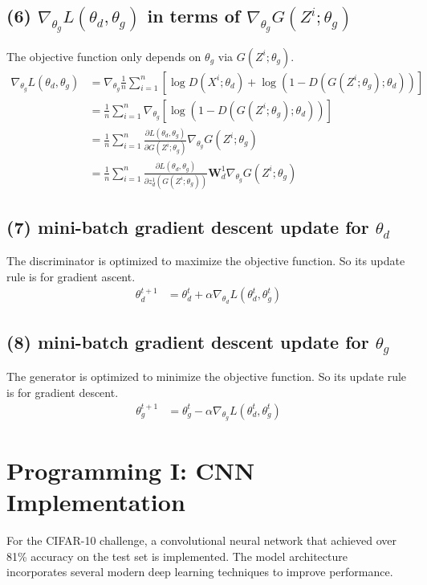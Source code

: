 \documentclass[11pt, a4paper, oneside]{memoir}
\begin{document}
\section*{(6) $\nabla_{\theta_g} L(\theta_d, \theta_g)$ in terms of $\nabla_{\theta_g} G(Z^i; \theta_g)$}
The objective function only depends on $\theta_g$ via $G(Z^i; \theta_g)$.
\begin{align*}
\nabla_{\theta_g} L (\theta_d, \theta_g) &= \nabla_{\theta_g} \frac{1}{n}\sum_{i=1}^{n} \left[ \log D(X^i; \theta_d) + \log (1 - D(G(Z^i; \theta_g); \theta_d)) \right] \\
&= \frac{1}{n}\sum_{i=1}^{n} \nabla_{\theta_g} \left[ \log (1 - D(G(Z^i; \theta_g); \theta_d)) \right] \\
&= \frac{1}{n}\sum_{i=1}^{n} \frac{\partial L(\theta_d, \theta_g)}{\partial G(Z^i; \theta_g)} \nabla_{\theta_g} G(Z^i; \theta_g) \\
&= \frac{1}{n}\sum_{i=1}^{n} \frac{\partial L(\theta_d, \theta_g)}{\partial z^1_d(G(Z^i; \theta_g))} \mathbf{W}^1_d \nabla_{\theta_g} G(Z^i; \theta_g)
\end{align*}

\section*{(7) mini-batch gradient descent update for $\theta_d$}
The discriminator is optimized to maximize the objective function. So its update rule is for gradient ascent.
\begin{align*}
\theta^{t+1}_d &= \theta^t_d + \alpha \nabla_{\theta_d} L (\theta^t_d, \theta^t_g)
\end{align*}

\section*{(8) mini-batch gradient descent update for $\theta_g$}
The generator is optimized to minimize the objective function. So its update rule is for gradient descent.
\begin{align*}
\theta^{t+1}_g &= \theta^t_g - \alpha \nabla_{\theta_g} L (\theta^t_d, \theta^t_g)
\end{align*}

\chapter{Programming I: CNN Implementation}
For the CIFAR-10 challenge, a convolutional neural network that achieved over 81\% accuracy on the test set is implemented.
The model architecture incorporates several modern deep learning techniques to improve performance.
\end{document}
